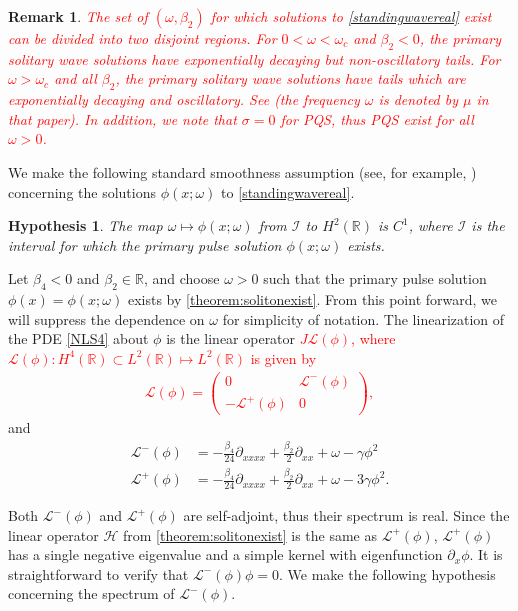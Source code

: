 \documentclass[12pt]{elsarticle}
\def\noi{\noindent}
\def\R{{\mathbb R}}
\def\calH{{\mathcal H}}
\def\calL{{\mathcal L}}
\def\calI{{\mathcal I}}
\newtheorem{hypothesis}{Hypothesis}
\newtheorem{remark}{Remark}
\newcommand{\revised}[1]{ \textcolor{red}{#1} }
\begin{document}
\begin{remark}\label{remark:soliton}
\revised{The set of $(\omega, \beta_2)$ for which solutions to \cref{standingwavereal} exist can be divided into two disjoint regions. For $0 < \omega < \omega_c$ and $\beta_2 < 0$, the primary solitary wave solutions have exponentially decaying but non-oscillatory tails. For $\omega > \omega_c$ and all $\beta_2$, the primary solitary wave solutions have tails which are exponentially decaying and oscillatory. See \cite[Figure 2(a)]{Tam2020} (the frequency $\omega$ is denoted by $\mu$ in that paper). In addition, we note that $\sigma = 0$ for PQS, thus PQS exist for all $\omega > 0$.} 
\end{remark}

\noi We make the following standard smoothness assumption (see, for example, \cite[Assumption 2]{Grillakis1987}) concerning the solutions $\phi(x; \omega)$ to \cref{standingwavereal}.

\begin{hypothesis}\label{hyp:smoothmap}
The map $\omega \mapsto \phi(x; \omega)$ from $\calI$ to $H^2(\R)$ is $C^1$, where $\calI$ is the interval for which the primary pulse solution $\phi(x; \omega)$ exists.
\end{hypothesis}

Let $\beta_4 < 0$ and $\beta_2 \in \R$, and choose $\omega > 0$ such that the primary pulse solution $\phi(x) = \phi(x; \omega)$ exists by \cref{theorem:solitonexist}. From this point forward, we will suppress the dependence on $\omega$ for simplicity of notation. The linearization of the PDE \cref{NLS4} about $\phi$ is the linear operator \revised{$J \calL(\phi)$, where $\calL(\phi): H^4(\R) \subset L^2(\R) \mapsto L^2(\R)$ is given by
\begin{align}\label{defLphi}
\calL(\phi) = 
\begin{pmatrix}
0 & \calL^-(\phi) \\
-\calL^+(\phi) & 0
\end{pmatrix},
\end{align}
}
and
\begin{align*}
\calL^-(\phi) &= -\frac{\beta_4}{24} \partial_{xxxx} + \frac{\beta_2}{2} \partial_{xx} + \omega - \gamma \phi^2 \\
\calL^+(\phi) &= -\frac{\beta_4}{24} \partial_{xxxx} + \frac{\beta_2}{2} \partial_{xx} + \omega - 3 \gamma \phi^2.
\end{align*}

Both $\calL^-(\phi)$ and $\calL^+(\phi)$ are self-adjoint, thus their spectrum is real. Since the linear operator $\calH$ from \cref{theorem:solitonexist} is the same as $\calL^+(\phi)$, $\calL^+(\phi)$ has a single negative eigenvalue and a simple kernel with eigenfunction $\partial_x \phi$. It is straightforward to verify that $\calL^-(\phi) \phi = 0$. We make the following hypothesis concerning the spectrum of $\calL^-(\phi)$.
\end{document}
